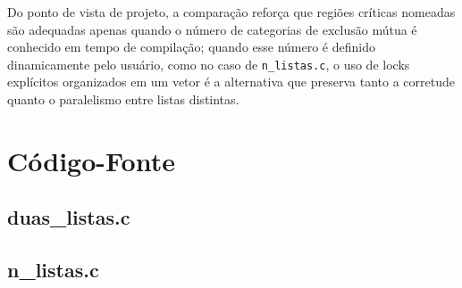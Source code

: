 \documentclass[a4paper,12pt]{article}
\begin{document}
Do ponto de vista de projeto, a comparação reforça que regiões críticas nomeadas são adequadas apenas quando o número de categorias de exclusão mútua é conhecido em tempo de compilação; quando esse número é definido dinamicamente pelo usuário, como no caso de \texttt{n\_listas.c}, o uso de locks explícitos organizados em um vetor é a alternativa que preserva tanto a corretude quanto o paralelismo entre listas distintas.

\newpage

\appendix
\section{Código-Fonte}

\subsection{duas\_listas.c}


\subsection{n\_listas.c}

\end{document}
